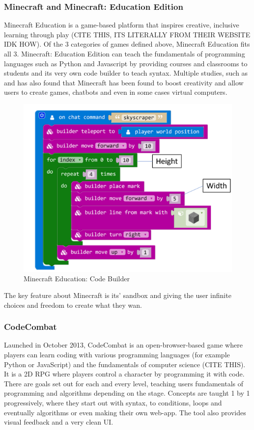 \subsubsection{Minecraft and Minecraft: Education Edition}
Minecraft Education is a game-based platform that inspires creative, inclusive learning through play (CITE THIS, ITS LITERALLY FROM THEIR WEBSITE IDK HOW). Of the 3 categories of games defined above, Minecraft Education fits all 3. Minecraft: Education Edition can teach the fundamentals of programming languages such as Python and Javascript by providing courses and classrooms to students and its very own code builder to teach syntax. Multiple studies, such as \cite{kuhn2018minecraft} and \cite{9803384} has also found that Minecraft has been found to boost creativity and allow users to create games, chatbots and even in some cases virtual computers.
\begin{figure}[H]
    \centering
    \includegraphics[width=0.5\linewidth]{images/blocks1_2.png}
    \caption{Minecraft Education: Code Builder}
\end{figure}

The key feature about Minecraft is its' sandbox and giving the user infinite choices and freedom to create what they wan.

\subsubsection{CodeCombat}
Launched in October 2013, CodeCombat is an open-browser-based game where players can learn coding with various programming languages (for example Python or JavaScript) and the fundamentals of computer science (CITE THIS). It is a 2D RPG where players control a character by programming it with code. There are goals set out for each and every level, teaching users fundamentals of programming and algorithms depending on the stage. Concepts are taught 1 by 1 progressively, where they start out with syntax, to conditions, loops and eventually algorithms or even making their own web-app. The tool also provides visual feedback and a very clean UI.

